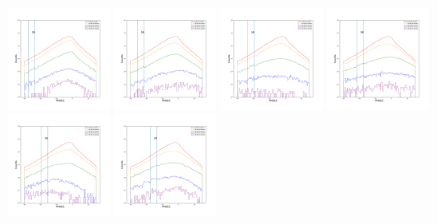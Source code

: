 \documentclass[12pt,prd]{article}
\begin{document}
\begin{figure}[h!]
\centering
\includegraphics[width=0.24\textwidth]{../figures/scanning_plotsgaiascan_l78_8_b58_4_ra224_7_dec46_3_npy_0.pdf}
\includegraphics[width=0.24\textwidth]{../figures/scanning_plotsgaiascan_l78_8_b58_4_ra224_7_dec46_3_npy_1.pdf}
\includegraphics[width=0.24\textwidth]{../figures/scanning_plotsgaiascan_l78_8_b58_4_ra224_7_dec46_3_npy_2.pdf}
\includegraphics[width=0.24\textwidth]{../figures/scanning_plotsgaiascan_l78_8_b58_4_ra224_7_dec46_3_npy_3.pdf}
\includegraphics[width=0.24\textwidth]{../figures/scanning_plotsgaiascan_l78_8_b58_4_ra224_7_dec46_3_npy_4.pdf}
\includegraphics[width=0.24\textwidth]{../figures/scanning_plotsgaiascan_l78_8_b58_4_ra224_7_dec46_3_npy_5.pdf}

\end{figure}
\end{document}
